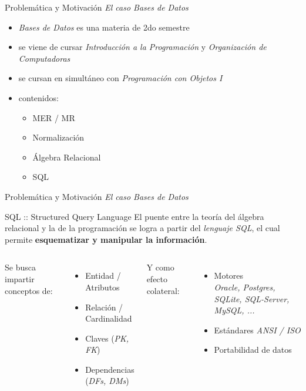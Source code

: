 \documentclass{beamer}
\begin{document}
\begin{frame}
    {Problemática y Motivación}
    {\emph{El caso Bases de Datos}}

    \begin{itemize}
        \item \emph{Bases de Datos} es una materia de 2do semestre
        \item se viene de cursar \emph{Introducción a la Programación}
        y \emph{Organización de Computadoras}
        \item se cursan en simultáneo con \emph{Programación con Objetos I}
        \item contenidos:
            \begin{itemize}
                \item MER / MR
                \item Normalización
                \item Álgebra Relacional
                \item SQL
            \end{itemize}
    \end{itemize}
\end{frame}

\begin{frame}
    {Problemática y Motivación}
    {\emph{El caso Bases de Datos}}

    \begin{block}{SQL :: Structured Query Language}
        El puente entre la teoría del álgebra relacional y la
        de la programación se logra a partir del \emph{lenguaje SQL},
        el cual permite \textbf{esquematizar y manipular la información}.
    \end{block}

    \vspace{1.5em}

    \begin{columns}[t]
        Se busca impartir conceptos de:
        \begin{itemize}
            \item Entidad / Atributos
            \item Relación / Cardinalidad
            \item Claves ({\footnotesize\emph{PK, FK}})
            \item Dependencias ({\footnotesize\emph{DFs, DMs}})
        \end{itemize}

        Y como efecto colateral:
        \begin{itemize}
            \item Motores \\ {\footnotesize\emph{Oracle, Postgres, SQLite, SQL-Server, MySQL, ...}}
            \item Estándares {\footnotesize\emph{ANSI / ISO}}
            \item Portabilidad de datos
        \end{itemize}

    \end{columns}

\end{frame}
\end{document}
